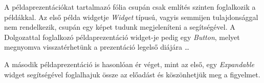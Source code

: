 A példaprezentációkat tartalmazó fólia csupán csak említés szinten foglalkozik a példákkal. Az első példa widgetje \textit{Widget} típusú, vagyis semmijen tulajdonsággal nem rendelkezik, csupán egy képet tudunk megjeleníteni a segítségével. A Dolgozattal foglalkozó példaprezentáció widget-je pedig egy \textit{Button}, melyet megnyomva visszatérhetünk a prezentáció legelső diájára \ldots

A második példaprezentáció is hasonlóan ér véget, mint az első, egy \textit{Expandable} widget segítségével foglalhajuk össze az előadást és köszönhetjük meg a figyelmet.
